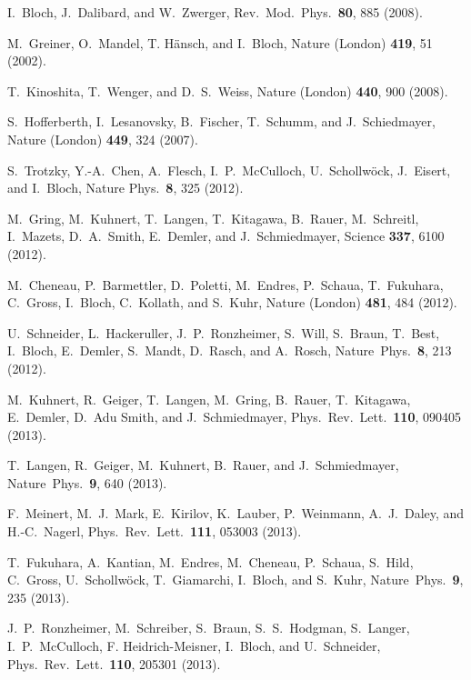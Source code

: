 \documentclass[twocolumn,superscriptaddress,prb,10pt]{revtex4-1}
\begin{document}
\begin{thebibliography}{99}


I.~Bloch, J.~Dalibard, and W.~Zwerger, Rev.\ Mod.\ Phys.\ {\bf 80}, 
885 (2008).

M.~Greiner, O.~Mandel, T. H\"ansch, and I.~Bloch, Nature (London) 
{\bf 419}, 51 (2002). 

T.~Kinoshita, T.~Wenger, and D.~S.~Weiss, Nature (London) {\bf 440}, 
900 (2008).

S.~Hofferberth, I.~Lesanovsky, B.~Fischer, T.~Schumm, and J.~Schiedmayer, 
Nature (London) {\bf 449}, 324 (2007). 

S.~Trotzky, Y.-A.~Chen, A.~Flesch, I.~P.~McCulloch, U.~Schollw\"ock, 
J.~Eisert, and I.~Bloch, Nature Phys.\ {\bf 8}, 325 (2012).

M.~Gring, M.~Kuhnert, T.~Langen, T.~Kitagawa, B.~Rauer, M.~Schreitl, 
I.~Mazets, D.~A.~Smith, E.~Demler, and J.~Schmiedmayer, Science {\bf 337}, 
6100 (2012).

M.~Cheneau, P.~Barmettler, D.~Poletti, M.~Endres, P.~Schaua, T.~Fukuhara, 
C.~Gross, I.~Bloch, C.~Kollath, and S.~Kuhr, Nature (London) {\bf 481}, 
484 (2012).

U.~Schneider, L.~Hackeruller, J.~P.~Ronzheimer, S.~Will, S.~Braun, T.~Best, 
I.~Bloch, E.~Demler, S.~Mandt, D.~Rasch, and A.~Rosch, Nature\ Phys.\ 
{\bf 8}, 213 (2012).

M.~Kuhnert, R.~Geiger, T.~Langen, M.~Gring, B.~Rauer,
T.~Kitagawa, E.~Demler, D.~Adu Smith, and J.~Schmiedmayer, Phys.\ Rev.\ 
Lett.\ {\bf 110}, 090405 (2013).

T.~Langen, R.~Geiger, M.~Kuhnert, B.~Rauer, and J.~Schmiedmayer, 
Nature\ Phys.\ {\bf 9}, 640 (2013).

F.~Meinert, M.~J.~Mark, E.~Kirilov, K.~Lauber, P.~Weinmann, 
A.~J.~Daley, and H.-C.~Nagerl, Phys.\ Rev.\ Lett.\ {\bf 111}, 
053003 (2013).

T.~Fukuhara, A.~Kantian, M.~Endres, M.~Cheneau, P.~Schaua, S.~Hild, C.~Gross, 
U.~Schollw\"ock, T.~Giamarchi, I.~Bloch, and S.~Kuhr, Nature\ Phys.\ {\bf 9}, 
235 (2013).

J.~P.~Ronzheimer, M.~Schreiber, S.~Braun, S.~S.~Hodgman, S.~Langer, I.~P.~McCulloch, 
F. Heidrich-Meisner, I.~Bloch, and U.~Schneider, Phys.\ Rev.\ Lett.\ {\bf 110}, 
205301 (2013).


\end{thebibliography}
\end{document}
